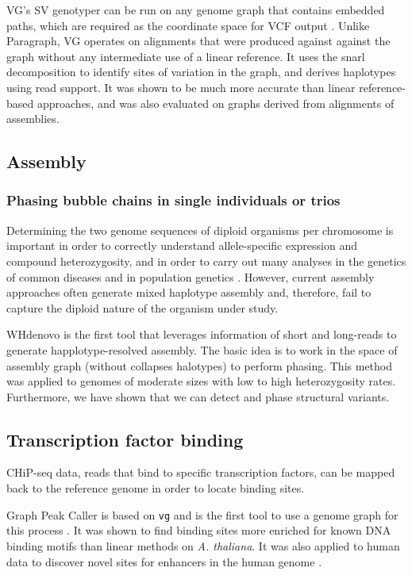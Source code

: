 VG's SV genotyper can be run on any genome graph that contains embedded paths, which are required as the coordinate space for VCF output \cite{hickey2019genotyping}.
Unlike Paragraph, VG operates on alignments that were produced against against the graph without any intermediate use of a linear reference.
It uses the snarl decomposition \cite{paten2018superbubbles} to identify sites of variation in the graph, and derives haplotypes using read support.
It was shown to be much more accurate than linear reference-based approaches, and was also evaluated on graphs derived from alignments of assemblies.

\subsection{Assembly}

\subsubsection{Phasing bubble chains in single individuals or trios}

Determining the two genome sequences of diploid organisms per chromosome is important in order to correctly understand allele-specific expression and compound heterozygosity, and in order to carry out many analyses in the genetics of common diseases and in population genetics \cite{tewhey2011importance}. 
However, current assembly approaches often generate mixed haplotype assembly and, therefore, fail to capture the diploid nature of the organism under study. 

WHdenovo \cite{garg2019trio, garg2018graph} is the first tool that leverages information of short and long-reads to generate happlotype-resolved assembly. 
The basic idea is to work in the space of assembly graph (without collapses halotypes) to perform phasing. 
This method was applied to genomes of moderate sizes with low to high heterozygosity rates. 
Furthermore, we have shown that we can detect and phase structural variants.

\subsection{Transcription factor binding}

CHiP-seq data, reads that bind to specific transcription factors, can be mapped back to the reference genome in order to locate binding sites.
 
Graph Peak Caller is based on \texttt{vg} and is the first tool to use a genome graph for this process \cite{Grytten_2019}.
It was shown to find binding sites more enriched for known DNA binding motifs than linear methods on \emph{A.
thaliana}.
It was also applied to human data to discover novel sites for enhancers in the human genome \cite{groza2019personalized}. 

